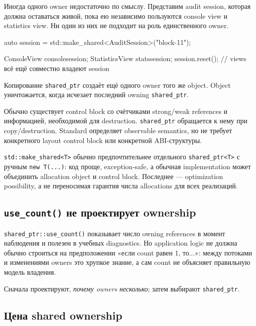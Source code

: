 Иногда одного owner недостаточно по смыслу. Представим audit session, которая
должна оставаться живой, пока ею независимо пользуются console view и statistics
view. Ни один из них не подходит на роль единственного owner.

\begin{cppcode}
auto session = std::make_shared<AuditSession>("block-11");

ConsoleView console{session};
StatisticsView stats{session};
session.reset(); // views всё ещё совместно владеют session
\end{cppcode}

Копирование \texttt{shared\_ptr} создаёт ещё одного owner того же object.
Object уничтожается, когда исчезает последний owning \texttt{shared\_ptr}.

\begin{implementationbox}
Обычно существует control block со счётчиками strong/weak references и
информацией, необходимой для destruction. \texttt{shared\_ptr} обращается к нему
при copy/destruction. Standard определяет observable semantics, но не требует
конкретного layout control block или конкретной ABI-структуры.
\end{implementationbox}

\texttt{std::make\_shared<T>} обычно предпочтительнее отдельного
\texttt{shared\_ptr<T>} с ручным \texttt{new T(...)}:
код проще, exception-safe, а обычная
implementation может объединить allocation object и control block. Последнее
--- optimization possibility, а не переносимая гарантия числа allocations для
всех реализаций.

\subsection{\texttt{use\_count()} не проектирует ownership}

\texttt{shared\_ptr::use\_count()} показывает число owning references в момент
наблюдения и полезен в учебных diagnostics. Но application logic не должна
обычно строиться на предположении «если count равен 1, то...»: между потоками и
изменениями owners это хрупкое знание, а сам count не объясняет правильную
модель владения.

Сначала проектируют, \emph{почему owners несколько}; затем выбирают
\texttt{shared\_ptr}.

\subsection{Цена shared ownership}

